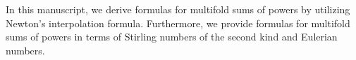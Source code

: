In this manuscript, we derive formulas for multifold sums of powers by
utilizing Newton's interpolation formula.
Furthermore, we provide formulas for multifold sums of powers
in terms of Stirling numbers of the second kind and Eulerian numbers.
